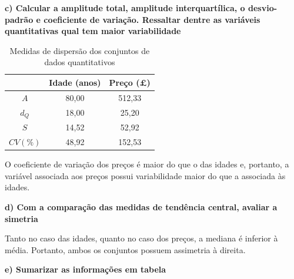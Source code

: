 \documentclass[brazil, a4paper, 11pt]{article}
\begin{document}
	\noindent\textbf{c) Calcular a amplitude total, amplitude interquartílica, o desvio-padrão e coeficiente de variação. Ressaltar dentre as variáveis quantitativas qual tem maior variabilidade}
	\begin{table}[H]
		\centering
		\caption{Medidas de dispersão dos conjuntos de dados quantitativos}
		\begin{tabular}{c|cc}
			\toprule
					& Idade (anos)	& Preço (\pounds)	\\
			\midrule
			$A$		& 80,00			& 512,33			\\
			$d_Q$	& 18,00			& 25,20 			\\
			$S$		& 14,52			& 52,92				\\
			$CV(\%)$& 48,92			& 152,53			\\
			\bottomrule
		\end{tabular}
	\end{table}
	O coeficiente de variação dos preços é maior do que o das idades e, portanto, a variável associada aos preços possui variabilidade maior do que a associada às idades.
	\vspace*{2\baselineskip}

	\noindent\textbf{d) Com a comparação das medidas de tendência central, avaliar a simetria}
	\vspace*{0.5\baselineskip}

	Tanto no caso das idades, quanto no caso dos preços, a mediana é inferior à média. Portanto, ambos os conjuntos possuem assimetria à direita.
	\vspace*{2\baselineskip}
	
	\noindent\textbf{e) Sumarizar as informações em tabela}
	\vspace*{0.5\baselineskip}
\end{document}
